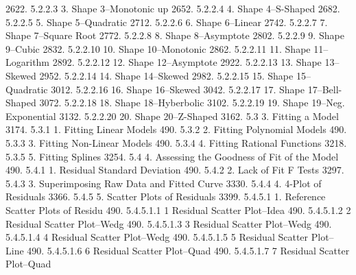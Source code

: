 2622.     5.2.2.3                           3. Shape 3--Monotonic up
2652.     5.2.2.4                           4. Shape 4--S-Shaped
2682.     5.2.2.5                           5. Shape 5--Quadratic
2712.     5.2.2.6                           6. Shape 6--Linear
2742.     5.2.2.7                           7. Shape 7--Square Root
2772.     5.2.2.8                           8. Shape 8--Asymptote
2802.     5.2.2.9                           9. Shape 9--Cubic
2832.     5.2.2.10                         10. Shape 10--Monotonic
2862.     5.2.2.11                         11. Shape 11--Logarithm
2892.     5.2.2.12                         12. Shape 12--Asymptote
2922.     5.2.2.13                         13. Shape 13--Skewed
2952.     5.2.2.14                         14. Shape 14--Skewed
2982.     5.2.2.15                         15. Shape 15--Quadratic
3012.     5.2.2.16                         16. Shape 16--Skewed
3042.     5.2.2.17                         17. Shape 17--Bell-Shaped
3072.     5.2.2.18                         18. Shape 18--Hyberbolic
3102.     5.2.2.19                         19. Shape 19--Neg. Exponential
3132.     5.2.2.20                         20. Shape 20--Z-Shaped
3162.     5.3                   3. Fitting a Model
3174.     5.3.1                       1. Fitting Linear Models
490.      5.3.2                       2. Fitting Polynomial Models
490.      5.3.3                       3. Fitting Non-Linear Models
490.      5.3.4                       4. Fitting Rational Functions
3218.     5.3.5                       5. Fitting Splines
3254.     5.4                   4. Assessing the Goodness of Fit of the Model
490.      5.4.1                       1. Residual Standard Deviation
490.      5.4.2                       2. Lack of Fit F Tests
3297.     5.4.3                       3. Superimposing Raw Data and Fitted Curve
3330.     5.4.4                       4. 4-Plot of Residuals
3366.     5.4.5                       5. Scatter Plots of Residuals
3399.     5.4.5.1                           1. Reference Scatter Plots of Residu
490.      5.4.5.1.1                               1  Residual Scatter Plot--Idea
490.      5.4.5.1.2                               2  Residual Scatter Plot--Wedg
490.      5.4.5.1.3                               3  Residual Scatter Plot--Wedg
490.      5.4.5.1.4                               4  Residual Scatter Plot--Wedg
490.      5.4.5.1.5                               5  Residual Scatter Plot--Line
490.      5.4.5.1.6                               6  Residual Scatter Plot--Quad
490.      5.4.5.1.7                               7  Residual Scatter Plot--Quad
